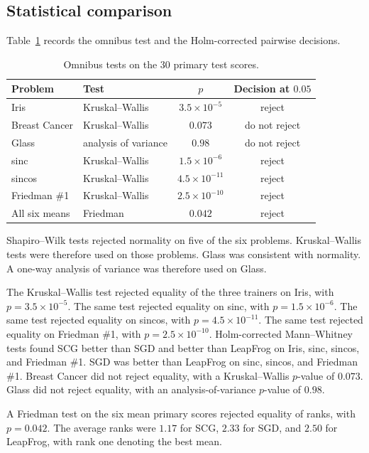 \documentclass[conference,10pt]{IEEEtran}
\begin{document}
\subsection{Statistical comparison}
\label{sec:res-stat}
Table~\ref{tab:stats} records the omnibus test and the Holm-corrected pairwise decisions.

\begin{table}[H]
\caption{Omnibus tests on the 30 primary test scores.}
\label{tab:stats}
\begin{center}
\begin{tabular}{llcc}
\toprule
Problem & Test & $p$ & Decision at $0.05$ \\
\midrule
Iris & Kruskal--Wallis & $3.5\times 10^{-5}$ & reject \\
Breast Cancer & Kruskal--Wallis & $0.073$ & do not reject \\
Glass & analysis of variance & $0.98$ & do not reject \\
sinc & Kruskal--Wallis & $1.5\times 10^{-6}$ & reject \\
sincos & Kruskal--Wallis & $4.5\times 10^{-11}$ & reject \\
Friedman \#1 & Kruskal--Wallis & $2.5\times 10^{-10}$ & reject \\
All six means & Friedman & $0.042$ & reject \\
\bottomrule
\end{tabular}
\end{center}
\end{table}

Shapiro--Wilk tests rejected normality on five of the six problems.
Kruskal--Wallis tests were therefore used on those problems.
Glass was consistent with normality.
A one-way analysis of variance was therefore used on Glass.

The Kruskal--Wallis test rejected equality of the three trainers on Iris, with $p=3.5\times 10^{-5}$.
The same test rejected equality on sinc, with $p=1.5\times 10^{-6}$.
The same test rejected equality on sincos, with $p=4.5\times 10^{-11}$.
The same test rejected equality on Friedman \#1, with $p=2.5\times 10^{-10}$.
Holm-corrected Mann--Whitney tests found SCG better than SGD and better than LeapFrog on Iris, sinc, sincos, and Friedman \#1.
SGD was better than LeapFrog on sinc, sincos, and Friedman \#1.
Breast Cancer did not reject equality, with a Kruskal--Wallis $p$-value of $0.073$.
Glass did not reject equality, with an analysis-of-variance $p$-value of $0.98$.

A Friedman test on the six mean primary scores rejected equality of ranks, with $p=0.042$.
The average ranks were $1.17$ for SCG, $2.33$ for SGD, and $2.50$ for LeapFrog, with rank one denoting the best mean.
\end{document}
